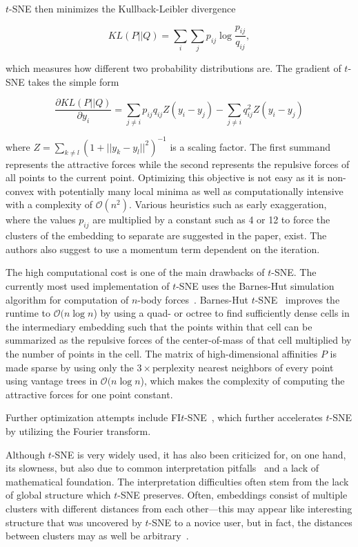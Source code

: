 $t$-SNE then minimizes the Kullback-Leibler divergence

\begin{equation}
    KL(P || Q) = \sum_i \sum_j p_{ij} \log \frac{p_{ij}}{q_{ij}},
\end{equation}

which measures how different two probability distributions are. The gradient of $t$-SNE
takes the simple form

\begin{equation}
    \frac{\partial KL(P||Q)}{\partial y_i} = \sum_{j \neq i} p_{ij}q_{ij}Z(y_i - y_j) - \sum_{j \neq i} q_{ij}^2Z(y_i - y_j)
\end{equation}

where $Z = \sum_{k \neq l} (1 + ||y_k - y_l||^2)^{-1}$ is a scaling factor. The
first summand represents the attractive forces while the second represents the
repulsive forces of all points to the current point. Optimizing this objective
is not easy as it is non-convex with potentially many local minima as well as
computationally intensive with a complexity of $\mathcal{O}(n^2)$. Various
heuristics such as early exaggeration, where the values $p_{ij}$ are multiplied
by a constant such as 4 or 12 to force the clusters of the embedding to
separate are suggested in the paper, exist. The authors also suggest to use a
momentum term dependent on the iteration.

The high computational cost is one of the main drawbacks of $t$-SNE. The
currently most used implementation of $t$-SNE uses the Barnes-Hut simulation
algorithm for computation of $n$-body forces~\cite{bh}. Barnes-Hut
$t$-SNE~\cite{bhtsne} improves the runtime to $\mathcal{O}(n \log n$) by using
a quad- or octree to find sufficiently dense cells in the intermediary
embedding such that the points within that cell can be summarized as the
repulsive forces of the center-of-mass of that cell multiplied by the number of
points in the cell. The matrix of high-dimensional affinities $P$ is made
sparse by using only the $3 \times \text{perplexity}$ nearest neighbors of
every point using vantage trees in $\mathcal{O}(n \log n$), which makes the
complexity of computing the attractive forces for one point constant.

Further optimization attempts include FI$t$-SNE~\cite{fitsne}, which further
accelerates $t$-SNE by utilizing the Fourier transform.

Although $t$-SNE is very widely used, it has also been criticized for, on one
hand, its slowness, but also due to common interpretation
pitfalls~\cite{misread_tsne} and a lack of mathematical foundation. The
interpretation difficulties often stem from the lack of global structure which
$t$-SNE preserves. Often, embeddings consist of multiple clusters with
different distances from each other---this may appear like interesting
structure that was uncovered by $t$-SNE to a novice user, but in fact, the
distances between clusters may as well be arbitrary~\cite{misread_tsne,
art_tsne}.

